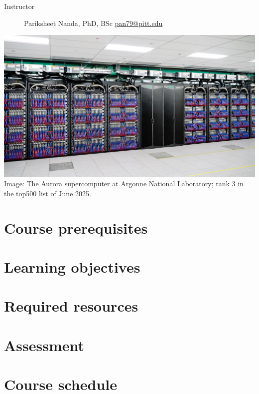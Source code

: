 \documentclass[12pt]{article}
\begin{document}

\begin{description}
\item[Instructor] Pariksheet Nanda, PhD, BSc \quad %
  \href{mailto:pan79@pitt.edu}{pan79@pitt.edu}
\end{description}

\noindent
\includegraphics[width=\linewidth]{1920x1080-Aurora hero image.jpg}
Image: The Aurora supercomputer at Argonne National Laboratory; %
rank 3 in the top500 list of June 2025.

\section{Course prerequisites}

\section{Learning objectives}

\section{Required resources}

\section{Assessment}

\section{Course schedule}
\end{document}
